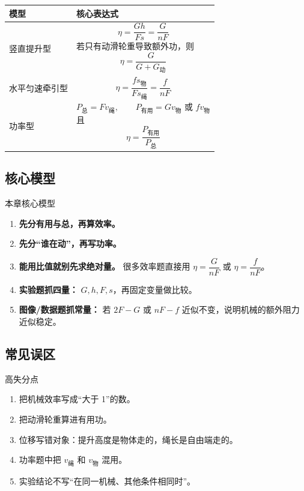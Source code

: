 \documentclass[12pt,a4paper]{ctexart}
\begin{document}
\begin{center}
\small
\begin{tabularx}{\textwidth}{>{\raggedright\arraybackslash}p{3.0cm} X}
\toprule
模型 & 核心表达式\\
\midrule
竖直提升型 &
\[
\eta=\frac{Gh}{Fs}=\frac{G}{nF}
\]
若只有动滑轮重导致额外功，则
\[
\eta=\frac{G}{G+G_{\text{动}}}
\]
\\[0.8em]
水平匀速牵引型 &
\[
\eta=\frac{fs_{\text{物}}}{Fs_{\text{绳}}}=\frac{f}{nF}
\]
\\[0.8em]
功率型 &
\[
P_{\text{总}}=Fv_{\text{绳}},\qquad
P_{\text{有用}}=Gv_{\text{物}} \text{ 或 } fv_{\text{物}}
\]
且
\[
\eta=\frac{P_{\text{有用}}}{P_{\text{总}}}
\]
\\
\bottomrule
\end{tabularx}
\end{center}

\subsection{核心模型}
\begin{modelbox}{本章核心模型}
\begin{enumerate}[label=\arabic*.]
\item \textbf{先分有用与总，再算效率。}
\item \textbf{先分“谁在动”，再写功率。}
\item \textbf{能用比值就别先求绝对量。} 很多效率题直接用 $\eta=\dfrac{G}{nF}$ 或 $\eta=\dfrac{f}{nF}$。
\item \textbf{实验题抓四量：} $G,h,F,s$，再固定变量做比较。
\item \textbf{图像/数据题抓常量：} 若 $2F-G$ 或 $nF-f$ 近似不变，说明机械的额外阻力近似稳定。
\end{enumerate}
\end{modelbox}

\subsection{常见误区}
\begin{pitfallbox}{高失分点}
\begin{enumerate}[label=\arabic*.]
\item 把机械效率写成“大于 1”的数。
\item 把动滑轮重算进有用功。
\item 位移写错对象：提升高度是物体走的，绳长是自由端走的。
\item 功率题中把 $v_{\text{绳}}$ 和 $v_{\text{物}}$ 混用。
\item 实验结论不写“在同一机械、其他条件相同时”。
\end{enumerate}
\end{pitfallbox}
\end{document}
